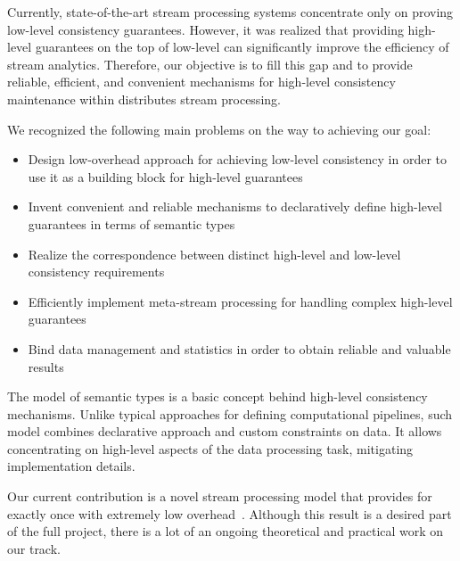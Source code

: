 \label{fs-phd-summary}

Currently, state-of-the-art stream processing systems concentrate only on proving low-level consistency guarantees. However, it was realized that providing high-level guarantees on the top of low-level can significantly improve the efficiency of stream analytics. Therefore, our objective is to fill this gap and to provide reliable, efficient, and convenient mechanisms for high-level consistency maintenance within distributes stream processing.

We recognized the following main problems on the way to achieving our goal:

\begin{itemize}
    \item Design low-overhead approach for achieving low-level consistency in order to use it as a building block for high-level guarantees  
    \item Invent convenient and reliable mechanisms to declaratively define high-level guarantees in terms of semantic types
    \item Realize the correspondence between distinct high-level and low-level consistency requirements
    \item Efficiently implement meta-stream processing for handling complex high-level guarantees
    \item Bind data management and statistics in order to obtain reliable and valuable results  
\end{itemize}

The model of semantic types is a basic concept behind high-level consistency mechanisms. Unlike typical approaches for defining computational pipelines, such model combines declarative approach and custom constraints on data. It allows concentrating on high-level aspects of the data processing task, mitigating implementation details.     

Our current contribution is a novel stream processing model that provides for exactly once with extremely low overhead~\cite{we2018seim, we2018beyondmr}. Although this result is a desired part of the full project, there is a lot of an ongoing theoretical and practical work on our track.   